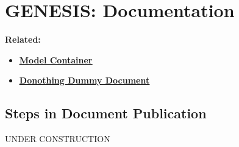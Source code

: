 \documentclass[12pt]{article}
\begin{document}
\section*{GENESIS: Documentation}

{\bf Related:}
\begin{itemize}

\item \href{../model-container/model-container.pdf}{\bf \underline{Model Container}}


\end{itemize}


\begin{itemize}

\item \href{../donothing/donothing.pdf}{\bf \underline{Donothing Dummy Document}}


\end{itemize}


\subsection*{Steps in Document Publication}


UNDER CONSTRUCTION
\end{document}
